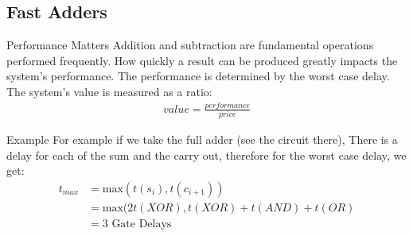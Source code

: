 \subsection{Fast Adders}
\begin{parag}{Performance Matters}
Addition and subtraction are fundamental operations performed frequently. How quickly a result can be produced greatly impacts the system's performance. The performance is determined by the worst case delay.\\
The system's value is measured as a ratio:
\begin{align*}
    value = \frac{performance}{price}
\end{align*}
\begin{subparag}{Example}
    For example if we take the full adder (see the circuit there), There is a delay for each of the sum and the carry out, therefore for the worst case delay, we get:
    \begin{align*}
        t_{max} &= \text{max}(t(s_i), t(c_{i+1}))\\
                &= \text{max}(2t(XOR), t(XOR) + t(AND) + t(OR) \\
                &= 3 \text{ Gate Delays}
    \end{align*}

    
    
\end{subparag}
\end{parag}


